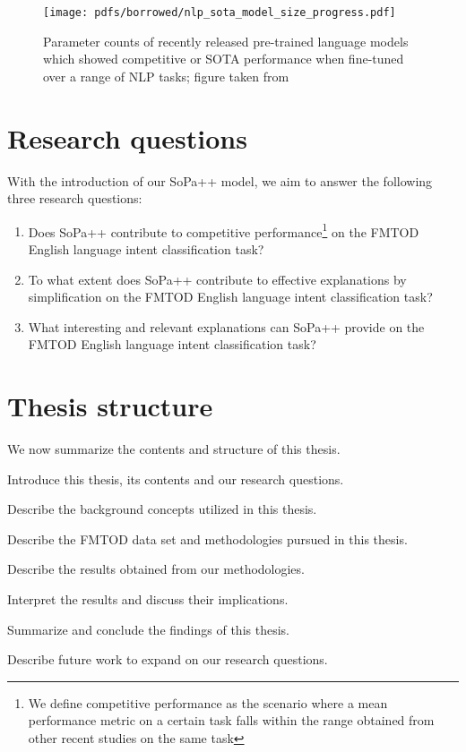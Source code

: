\begin{figure}[th]
  \centering
  \texttt{[image: pdfs/borrowed/nlp\_sota\_model\_size\_progress.pdf]}
  \caption{Parameter counts of recently released pre-trained language models
    which showed competitive or SOTA performance when fine-tuned over a range of
    NLP tasks; figure taken from \citet{sanh2019distilbert}}
  \label{fig:nlp_progress}
\end{figure}

\section{Research questions}

\label{section:rq}

With the introduction of our SoPa++ model, we aim to answer the following three
research questions:

\begin{enumerate}
  \item Does SoPa++ contribute to competitive performance\footnote{We define
    competitive performance as the scenario where a mean performance metric on a
    certain task falls within the range obtained from other recent studies on
    the same task} on the FMTOD English language intent classification task?
  \item To what extent does SoPa++ contribute to effective explanations by
  simplification on the FMTOD English language intent classification task?
  \item What interesting and relevant explanations can SoPa++ provide on the
  FMTOD English language intent classification task?
\end{enumerate}

\section{Thesis structure}

We now summarize the contents and structure of this thesis.

\begin{description}[align=left]
  \item [Chapter \ref{chapter:introduction}:] Introduce this thesis, its
  contents and our research questions.
  \item [Chapter \ref{chapter:background}:] Describe the background concepts
  utilized in this thesis.
  \item [Chapter \ref{chapter:methodologies}:] Describe the FMTOD data set and
  methodologies pursued in this thesis.
  \item [Chapter \ref{chapter:results}:] Describe the results obtained from our
  methodologies.
  \item [Chapter \ref{chapter:discussion}:] Interpret the results and discuss their
  implications.
  \item [Chapter \ref{chapter:conclusions}:] Summarize and conclude the findings
  of this thesis.
  \item [Chapter \ref{chapter:further_work}:] Describe future work to expand on
  our research questions.
\end{description}


